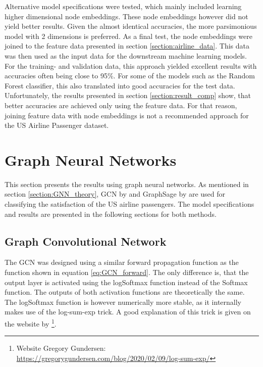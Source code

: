   \noindent Alternative model specifications were tested, which mainly included
  learning higher dimensional node embeddings. These node embeddings however
  did not yield better results. Given the almost identical accuracies, the more
  parsimonious model with 2 dimensions is preferred. As a final test, the node
  embeddings were joined to the feature data presented in section 
  \ref{section:airline_data}. This data was then used as the input data for the
  downstream machine learning models. For the training- and validation data,
  this approach yielded excellent results with accuracies often being close to 
  95\%. For some of the models such as the Random Forest classifier, this also
  translated into good accuracies for the test data. Unfortunately, the results 
  presented in section \ref{section:result_comp} show, that better accuracies 
  are achieved only using the feature data. For that reason, joining feature 
  data with node embeddings is not a recommended approach for the US Airline 
  Passenger dataset.

  \section{Graph Neural Networks}

  This section presents the results using graph neural networks. As
  mentioned in section \ref{section:GNN_theory}, GCN by \cite{kipf2016semi} and
  GraphSage by \cite{hamilton2017inductive} are used for classifying the
  satisfaction of the US airline passengers. The model specifications 
  and results are presented in the following sections for both methods.

  \subsection{Graph Convolutional Network}
  \label{section:GCN_results}

  The GCN was designed using a similar forward propagation function as the
  function shown in equation \ref{eq:GCN_forward}. The only difference is, that
  the output layer is activated using the logSoftmax function instead of the
  Softmax function. The outputs of both activation functions are theoretically 
  the same. The logSoftmax function is however numerically more stable, as it 
  internally makes use of the log-sum-exp trick. A good explanation of this
  trick is given on the website by \cite{gundersen2020}\footnote{Website 
  Gregory Gundersen: \\\url{https://gregorygundersen.com/blog/2020/02/09/log-sum-exp/}}.

